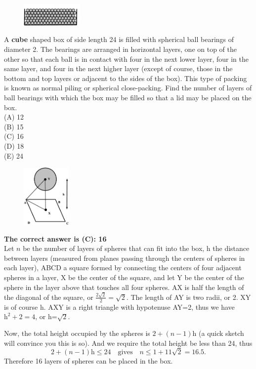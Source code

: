\documentclass{article}
\begin{document}
\normalsize
\begin{figure}
	\includegraphics[width=30mm,viewport=27 69 511 230]{CCFR73-10pic1.eps}
\end{figure}
A \textbf{cube} shaped box of side length 24 is filled with spherical ball bearings of diameter 2. The bearings are arranged in horizontal layers, one on top of the other so that each ball is in contact with four in the next lower layer, four in the same layer, and four in the next higher layer (except of course, those in the bottom and top layers or adjacent to the sides of the box). This type of packing is known as normal piling or spherical close-packing. Find the number of layers of ball bearings with which the box may be filled so that a lid may be placed on the box.\\
(A) 12\\
(B) 15\\
(C) 16\\
(D) 18\\
(E) 24\\

\begin{figure}
	\includegraphics[width=24mm,viewport=14 42 526 688]{CCFR73-10pic3.eps}
\end{figure}

\textbf{The correct answer is (C): 16}\\[1 ex]
Let $n$ be the number of layers of spheres that can fit into the box, h the distance between layers (measured from planes passing through the centers of spheres in each layer), ABCD a square formed by connecting the centers of four adjacent spheres in a layer, X be the center of the square, and let Y be the center of the sphere in the layer above that touches all four spheres. AX is half the length of the diagonal of the square, or $\frac{2\sqrt{2}}{2}=\sqrt{2}$. The length of AY is two radii, or 2. XY is of course h. AXY is a right triangle with hypotenuse AY=2, thus we have $\textrm{h}^{2}+2=4$, or h=$\sqrt{2}$.

Now, the total height occupied by the spheres is $2+(n-1)\textrm{h}$ (a quick sketch will convince you this is so). And we require the total height be less than 24, thus
\begin{equation*} 
2+(n-1)\textrm{h} \leq 24 \quad\textrm{gives}\quad n \leq1+11\sqrt{2}=16.5.
\end{equation*}
Therefore 16 layers of spheres can be placed in the box. 
\end{document}
